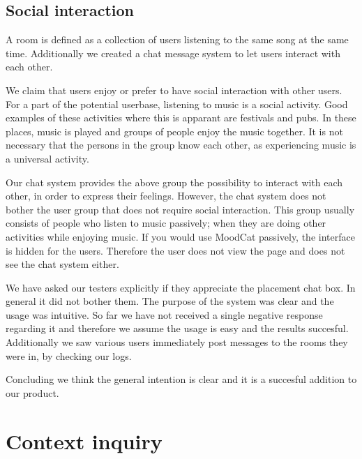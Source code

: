 \subsection{Social interaction}

A room is defined as a collection of users listening to the same song at the same time.
Additionally we created a chat message system to let users interact with each other.

We claim that users enjoy or prefer to have social interaction with other users.
For a part of the potential userbase, listening to music is a social activity.
Good examples of these activities where this is apparant are festivals and pubs.
In these places, music is played and groups of people enjoy the music together.
It is not necessary that the persons in the group know each other, as experiencing music is a universal activity.

Our chat system provides the above group the possibility to interact with each other, in order to express their feelings.
However, the chat system does not bother the user group that does not require social interaction.
This group usually consists of people who listen to music passively; when they are doing other activities while enjoying music.
If you would use MoodCat passively, the interface is hidden for the users.
Therefore the user does not view the page and does not see the chat system either.

We have asked our testers explicitly if they appreciate the placement chat box.
In general it did not bother them.
The purpose of the system was clear and the usage was intuitive.
So far we have not received a single negative response regarding it and therefore we assume the usage is easy and the results succesful.
Additionally we saw various users immediately post messages to the rooms they were in, by checking our logs.

Concluding we think the general intention is clear and it is a succesful addition to our product.

\section{Context inquiry}


